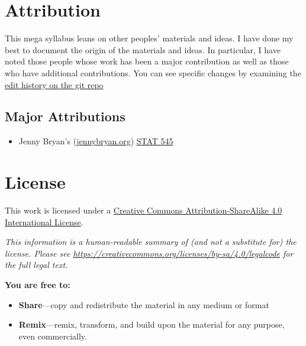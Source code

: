 \documentclass[
]{book}
\providecommand{\tightlist}{%
  \setlength{\itemsep}{0pt}\setlength{\parskip}{0pt}}
\begin{document}
\hypertarget{attribution}{%
\chapter*{Attribution}\label{attribution}}

This mega syllabus leans on other peoples' materials and ideas. I have done my best to document the origin of the materials and ideas. In particular, I have noted those people whose work has been a major contribution as well as those who have additional contributions. You can see specific changes by examining the \href{https://github.com/smasongarrison/Syllabi/commits/main}{edit history on the git repo}

\hypertarget{major-attributions}{%
\section*{Major Attributions}\label{major-attributions}}

\begin{itemize}
\tightlist
\item
  Jenny Bryan's (\href{https://jennybryan.org}{jennybryan.org}) \href{https://stat545.com}{STAT 545}
\end{itemize}

\hypertarget{license}{%
\chapter*{License}\label{license}}

This work is licensed under a \href{https://creativecommons.org/licenses/by-sa/4.0/}{Creative Commons Attribution-ShareAlike 4.0 International License}.

\emph{This information is a human-readable summary of (and not a substitute for) the license.
Please see \url{https://creativecommons.org/licenses/by-sa/4.0/legalcode} for the full legal text.}

\textbf{You are free to:}

\begin{itemize}
\item
  \textbf{Share}---copy and redistribute the material in any medium or
  format
\item
  \textbf{Remix}---remix, transform, and build upon the material for any
  purpose, even commercially.
\end{itemize}
\end{document}
